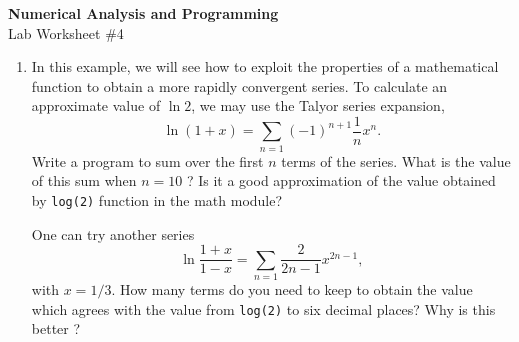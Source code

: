 \documentclass[12pt]{article}
\begin{document}
\begin{center}
\Large
\textbf{Numerical Analysis and Programming}\\
\large
Lab Worksheet \#4
\end{center}
\begin{enumerate}

\item  In this example, we will  see how to exploit the properties of a mathematical function  to obtain a more rapidly convergent series. To calculate an approximate value of $\ln 2$, we may use the Talyor series expansion,
\[
\ln (1+x) =\sum_{n=1} (-1)^{n+1}\frac{1}{n}x^n.
\]
Write a program to sum over the first $n$ terms of the series. What is the value of this sum when $n=10$ ? Is it a good approximation of  the value obtained by \verb'log(2)' function in the math module? 

One can try another series
 \[
\ln \frac{1+x}{1-x} =\sum_{n=1} \frac{2}{2n-1}x^{2n-1},
\]
with $x=1/3$. How many terms do you need to keep to obtain the value which agrees with the value from \verb'log(2)' to six decimal places? Why is this better ? 

\end{enumerate}
\end{document}
